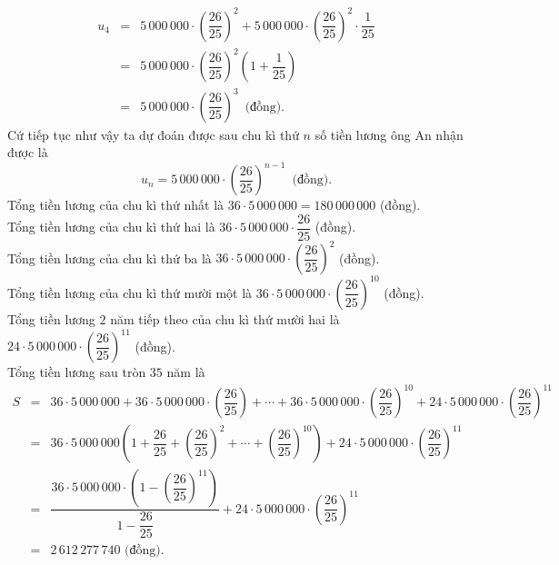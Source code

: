 \begin{ex}
{\begin{itemchoice}
\begin{eqnarray*}
				u_4&=&5\,000\,000\cdot\left(\dfrac{26}{25}\right)^2+5\,000\,000\cdot\left(\dfrac{26}{25}\right)^2\cdot \dfrac{1}{25}\\ 
				&=&5\,000\,000\cdot\left(\dfrac{26}{25}\right)^2\left(1+\dfrac{1}{25}\right)\\ 
				&=&5\,000\,000\cdot\left(\dfrac{26}{25}\right)^3\,\text{ (đồng).} 
			\end{eqnarray*}
			Cứ tiếp tục như vậy ta dự đoán được sau chu kì thứ $n$ số tiền lương  ông An nhận được là
			 $$ u_n=5\,000\,000\cdot\left(\dfrac{26}{25}\right)^{n-1} \,\text{ (đồng).}$$
			\itemch Tổng tiền lương của chu kì thứ nhất  là $36\cdot5\,000\,000=180\,000\,000$ (đồng).\\
			Tổng tiền lương của chu kì thứ hai là $36\cdot5\,000\,000\cdot \dfrac{26}{25}$ (đồng).\\ 
			Tổng tiền lương  của chu kì thứ ba là $36\cdot5\,000\,000\cdot\left(\dfrac{26}{25}\right)^2$ (đồng).\\
			Tổng tiền lương của chu kì thứ mười một là $36\cdot5\,000\,000\cdot\left(\dfrac{26}{25}\right)^{10}$  (đồng).\\
			Tổng tiền lương $2$ năm tiếp theo  của chu kì thứ mười hai là $24\cdot5\,000\,000\cdot\left(\dfrac{26}{25}\right)^{11}$ (đồng).\\
			Tổng tiền lương sau tròn $35$  năm là
			\begin{eqnarray*}
				 S&=&36\cdot5\,000\,000+36\cdot5\,000\,000 \cdot\left(\dfrac{26}{25}\right)+\cdots
				+36\cdot5\,000\,000  \cdot\left(\dfrac{26}{25}\right)^{10}+24\cdot5\,000\,000\cdot\left(\dfrac{26}{25}\right)^{11}\\
				&=&36\cdot5\,000\,000\left(1+\dfrac{26}{25}+\left(\dfrac{26}{25}\right)^2+\cdots+\left(\dfrac{26}{25}\right)^{10}\right)+24\cdot5\,000\,000\cdot\left(\dfrac{26}{25}\right)^{11} \\ 
				&=&\dfrac{36\cdot5\,000\,000  \cdot\left(1-\left(\dfrac{26}{25}\right)^{11}\right)}{1-\dfrac{26}{25}}+24\cdot5\,000\,000\cdot\left(\dfrac{26}{25}\right)^{11}\\
				&=&2\,612\,277\,740 \text{  (đồng).}
			\end{eqnarray*}
		\end{itemchoice}
	} 
\end{ex}

